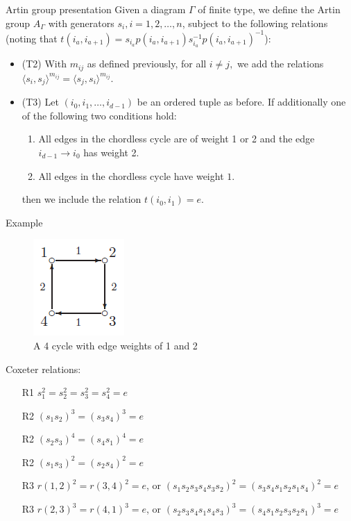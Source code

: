 \documentclass{beamer}
\begin{document}
\begin{frame}{Artin group presentation}
Given a diagram $\Gamma$ of finite type, we define the Artin group $A_{\Gamma}$ with generators $s_i, i = 1,2,\ldots, n$, subject to the following relations (noting that $t(i_a,i_{a+1}) = s_{i_a} p(i_a,i_{a+1})  s_{i_a}^{-1}p(i_a,i_{a+1})^{-1}$):

\begin{block}

\begin{itemize}

\item{\alert{(T2)}} With $m_{ij}$ as defined previously, for all $i \neq j,$ we add the relations
$\langle s_i,s_j \rangle^{m_{ij}}= \langle s_j,s_i \rangle^{m_{ij}}.$

\item{\alert{(T3)}} Let $(i_0,i_1,\ldots,i_{d-1})$ be an ordered tuple as before. If additionally one of the following two conditions hold:
\begin{enumerate}
\item All edges in the chordless cycle are of weight 1 or 2 and the edge $i_{d-1}\rightarrow i_0$ has weight 2.
\item All edges in the chordless cycle have weight $1.$
\end{enumerate}
then we include the relation
$t(i_0,i_1) = e.$

\end{itemize}

\end{block}
\end{frame}

\begin{frame}{Example}
\begin{figure}
\centering
\includegraphics[scale=.5]{4cycle.PNG}
\caption{A 4 cycle with edge weights of 1 and 2}
\end{figure}

\small
Coxeter relations:
\begin{itemize}
\item[R1] $s_1^2 = s_2^2 = s_3^2 = s_4^2 = e$
\item[R2] $(s_1s_2)^3 = (s_3s_4)^3 = e$
\item[R2] $(s_2s_3)^4 = (s_4s_1)^4 = e$
\item[R2] $(s_1s_3)^2 = (s_2s_4)^2 = e$
\item[R3] $r(1,2)^2 = r(3,4)^2 = e$, or $(s_1s_2s_3s_4s_3s_2)^2 = (s_3s_4s_1s_2s_1s_4)^2 = e$
\item[R3] $r(2,3)^3 = r(4,1)^3 = e$, or $(s_2s_3s_4s_1s_4s_3)^3 = (s_4s_1s_2s_3s_2s_1)^3 = e$
\end{itemize}
\end{frame}
\end{document}

